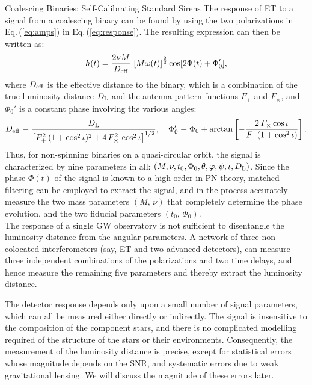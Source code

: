 {Coalescing Binaries: Self-Calibrating Standard Sirens}
{
The response of ET to a signal from a coalescing binary can be
found by using the two polarizations in Eq.\,(\ref{eq:amps}) in 
Eq.\,(\ref{eq:response}). The resulting expression can then be written as:
\begin{equation}
h(t) = \frac{2\nu M}{D_{\rm eff}}\, \left [ M\omega(t)\right]^{\frac{2}{3}} \cos[2\Phi(t) + \Phi_0'],
\label{eq:response1}
\end{equation}
where $D_{\rm eff}$ is the effective distance to the binary, which
is a combination of the true luminosity distance $D_{\rm L}$ and
the antenna pattern functions $F_+$ and $F_\times$, and $\Phi_0'$ 
is a constant phase involving the various angles:
\begin{equation}
D_{\rm eff} \equiv \frac{D_{\rm L}}{ \left [ F_+^2\, (1+\cos^2\iota)^2 +
       4\, F_\times^2\, \cos^2\iota \right ]^{1/2}}, \quad
\Phi_0' \equiv \Phi_0 + \arctan \left [-\frac{2\, F_\times\cos\iota }{F_+ (1+\cos^2\iota)}\right ].
\label{eq:response2}
\end{equation}
Thus, for non-spinning binaries on a quasi-circular orbit, the signal is 
characterized by nine parameters in all: $(M, \nu, t_0, \Phi_0, \theta, \varphi, \psi, \iota, D_{\rm L})$.
Since the phase $\Phi(t)$ of the signal is known
to a high order in PN theory, matched filtering can be employed to
extract the signal, and in the process accurately measure the two mass
parameters $(M,\, \nu)$ that completely determine the phase evolution, 
and the two fiducial parameters $(t_0,\, \Phi_0)$.
\\[5pt]
The response of a single GW observatory is not 
sufficient to disentangle the luminosity distance from the angular
parameters.  A network of three non-colocated interferometers (say, ET
and two advanced detectors), can measure three independent combinations 
of the polarizations and two time delays, and hence measure the remaining 
five parameters and thereby extract the luminosity distance.
\vskip 0.2cm
}

The detector response depends only upon a
small number of signal parameters, which can all be measured
either directly or indirectly. The signal is insensitive to
the composition of the component stars, and there is
no complicated modelling required of the structure of the
stars or their environments. Consequently, the measurement
of the luminosity distance is precise, except for statistical errors 
whose magnitude depends on the SNR, and systematic
errors due to weak gravitational lensing. We will discuss
the magnitude of these errors later.


